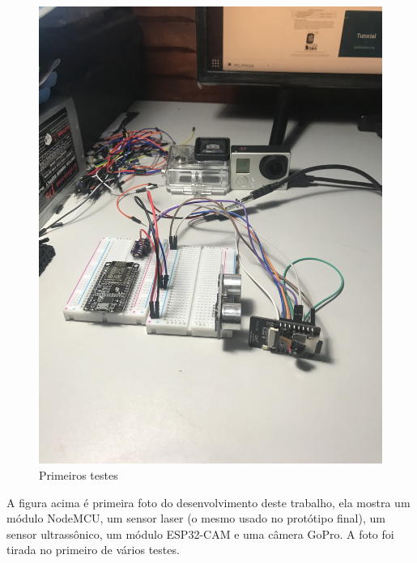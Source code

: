 \documentclass[
	12pt,				%
	openright,			%
	oneside,			%
	a4paper,			%
	chapter=TITLE,		%
	english,			%
	brazil				%
	]{abntex2}
\begin{document}
\begin{figure}[H]
    \centering
    \includegraphics[scale=0.09, angle=-90]{imagens/IMG_8989.jpg}
    \caption{Primeiros testes}
        \label{fig:aprincipio}
    \end{figure}

A figura acima é primeira foto do desenvolvimento deste trabalho, ela mostra um módulo NodeMCU, um sensor laser (o mesmo usado no protótipo final), 
um sensor ultrassônico, um módulo ESP32-CAM e uma câmera GoPro. A foto foi tirada no primeiro de vários testes. 
\end{document}
